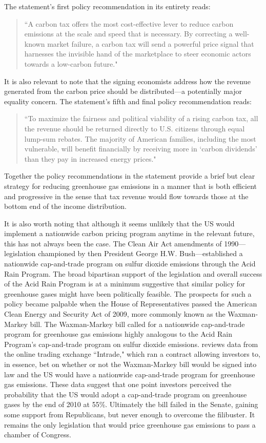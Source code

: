 The statement's first policy recommendation in its entirety reads:
\begin{quote}
    ``A carbon tax offers the most cost-effective lever to reduce carbon emissions at the scale and speed that is necessary. By correcting a well-known market failure, a carbon tax will send a powerful price signal that harnesses the invisible hand of the marketplace to steer economic actors towards a low-carbon future." 
\end{quote}

It is also relevant to note that the signing economists address how the revenue generated from the carbon price should be distributed---a potentially major equality concern. The statement's fifth and final policy recommendation reads: 
\begin{quote}
    ``To maximize the fairness and political viability of a rising carbon tax, all the revenue should be returned directly to U.S. citizens through equal lump-sum rebates. The majority of American families, including the most vulnerable, will benefit financially by receiving more in `carbon dividends' than they pay in increased energy prices."
\end{quote}
Together the policy recommendations in the statement provide a brief but clear strategy for reducing greenhouse gas emissions in a manner that is both efficient and progressive in the sense that tax revenue would flow towards those at the bottom end of the income distribution. 

It is also worth noting that although it seems unlikely that the US would implement a nationwide carbon pricing program anytime in the relevant future, this has not always been the case. The Clean Air Act amendments of 1990---legislation championed by then President George H.W. Bush---established a nationwide cap-and-trade program on sulfur dioxide emissions through the Acid Rain Program. The broad bipartisan support of the legislation and overall success of the Acid Rain Program is at a minimum suggestive that similar policy for greenhouse gases might have been politically feasible. The prospects for such a policy became palpable when the House of Representatives passed the American Clean Energy and Security Act of 2009, more commonly known as the Waxman-Markey bill. The Waxman-Markey bill called for a nationwide cap-and-trade program for greenhouse gas emissions highly analogous to the Acid Rain Program's cap-and-trade program on sulfur dioxide emissions. \cite{meng2017using} reviews data from the online trading exchange ``Intrade," which ran a contract allowing investors to, in essence,  bet on whether or not the Waxman-Markey bill would be signed into law and the US would have a nationwide cap-and-trade program for greenhouse gas emissions. These data suggest that one point investors perceived the probability that the US would adopt a cap-and-trade program on greenhouse gases by the end of 2010 at 55\%. Ultimately the bill failed in the Senate, gaining some support from Republicans, but never enough to overcome the filibuster. It remains the only legislation that would price greenhouse gas emissions to pass a chamber of Congress. 

